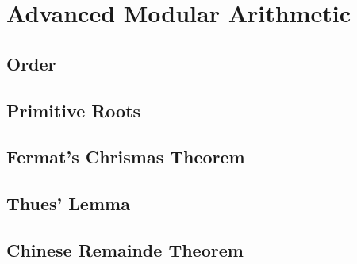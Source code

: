 \chapter{Advanced Modular Arithmetic}
\section{Order}
\section{Primitive Roots}
\section{Fermat's Chrismas Theorem}
\section{Thues' Lemma}
\section{Chinese Remainde Theorem}
